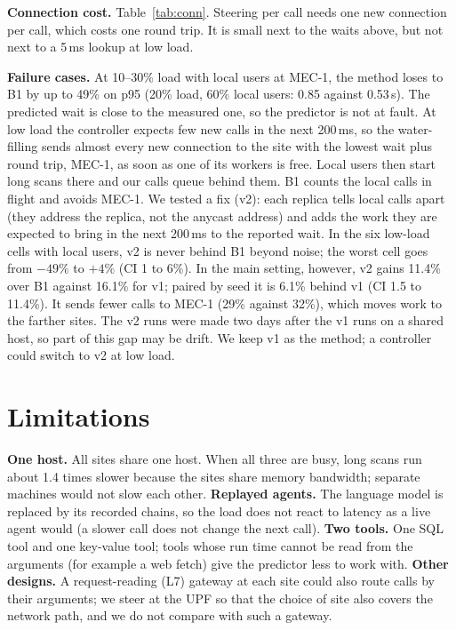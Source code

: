 \documentclass{article}
\begin{document}
\textbf{Connection cost.} Table~\ref{tab:conn}. Steering per call needs one new connection
per call, which costs one round trip. It is small next to the waits above, but not next to
a 5\,ms lookup at low load.

\textbf{Failure cases.} At 10--30\% load with local users at MEC-1, the method loses to B1
by up to 49\% on p95 (20\% load, 60\% local users: 0.85 against 0.53\,s). The predicted
wait is close to the measured one, so the predictor is not at fault. At low load the
controller expects few new calls in the next 200\,ms, so the water-filling sends almost
every new connection to the site with the lowest wait plus round trip, MEC-1, as soon as
one of its workers is free. Local users then start long scans there and our calls queue
behind them. B1 counts the local calls in flight and avoids MEC-1. We tested a fix (v2):
each replica tells local calls apart (they address the replica, not the anycast address)
and adds the work they are expected to bring in the next 200\,ms to the reported wait. In
the six low-load cells with local users, v2 is never behind B1 beyond noise; the worst
cell goes from $-49\%$ to $+4\%$ (CI 1 to 6\%). In the main setting, however, v2 gains
11.4\% over B1 against 16.1\% for v1; paired by seed it is 6.1\% behind v1 (CI 1.5 to
11.4\%). It sends fewer calls to MEC-1 (29\% against 32\%), which moves work to the farther
sites. The v2 runs were made two days after the v1 runs on a shared host, so part of this
gap may be drift. We keep v1 as the method; a controller could switch to v2 at low load.

\section{Limitations}
\textbf{One host.} All sites share one host. When all three are busy, long scans run
about 1.4 times slower because the sites share memory bandwidth; separate machines would
not slow each other. \textbf{Replayed agents.} The language model is replaced by its
recorded chains, so the load does not react to latency as a live agent would (a slower
call does not change the next call). \textbf{Two tools.} One SQL tool and one key-value
tool; tools whose run time cannot be read from the arguments (for example a web fetch)
give the predictor less to work with. \textbf{Other designs.} A request-reading (L7)
gateway at each site could also route calls by their arguments; we steer at the UPF so
that the choice of site also covers the network path, and we do not compare with such a
gateway.
\end{document}
